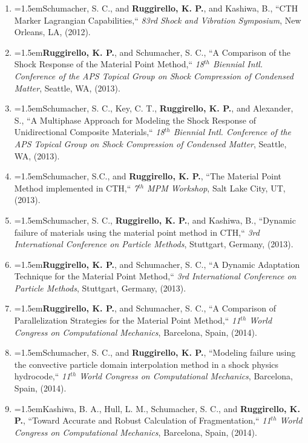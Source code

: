 \documentclass{scrartcl}
\newcommand{\NewCPap}[5]{\noindent\hangindent=1.5em\hangafter=0\footnotesize #1, ``#2,`` \textit{#3}, #4, (#5). %
\vspace{0.em} \normalsize} %
\begin{document}
\begin{cv}{}
\begin{mdframed}[
  linecolor=white,%
  leftmargin =-0cm,
  rightmargin =+0cm,
]
\begin{enumerate}
\item\NewCPap{Schumacher, S. C., and \textbf{Ruggirello, K. P.}, and Kashiwa, B.}{CTH Marker Lagrangian Capabilities}{83rd Shock and Vibration Symposium}{New Orleans, LA}{2012}

\item\NewCPap{\textbf{Ruggirello, K. P.}, and Schumacher, S. C.}{A Comparison of the Shock Response of the Material Point Method}{18$^{th}$ Biennial Intl. Conference of the APS Topical Group on Shock Compression of Condensed Matter}{Seattle, WA}{2013}

\item\NewCPap{Schumacher, S. C., Key, C. T., \textbf{Ruggirello, K. P.}, and Alexander, S.}{A Multiphase Approach for Modeling the Shock Response of Unidirectional Composite Materials}{18$^{th}$ Biennial Intl. Conference of the APS Topical Group on Shock Compression of Condensed Matter}{Seattle, WA}{2013}

\item\NewCPap{Schumacher, S.C., and \textbf{Ruggirello, K. P.}}{The Material Point Method implemented in CTH}{7$^{th}$ MPM Workshop}{Salt Lake City, UT}{2013}

\item\NewCPap{Schumacher, S. C., \textbf{Ruggirello, K. P.}, and Kashiwa, B.}{Dynamic failure of materials using the material point method in CTH}{3rd International Conference on Particle Methods}{Stuttgart, Germany}{2013}

\item\NewCPap{\textbf{Ruggirello, K. P.}, and Schumacher, S. C.}{A Dynamic Adaptation Technique for the Material Point Method}{3rd International Conference on Particle Methods}{Stuttgart, Germany}{2013}

\item\NewCPap{\textbf{Ruggirello, K. P.}, and Schumacher, S. C.}{A Comparison of Parallelization Strategies for the Material Point Method}{11$^{th}$ World Congress on Computational Mechanics}{Barcelona, Spain}{2014}

\item\NewCPap{Schumacher, S. C., and \textbf{Ruggirello, K. P.}}{Modeling failure using the convective particle domain interpolation method in a shock physics hydrocode}{11$^{th}$ World Congress on Computational Mechanics}{Barcelona, Spain}{2014}

\item\NewCPap{Kashiwa, B. A., Hull, L. M., Schumacher, S. C., and \textbf{Ruggirello, K. P.}}{Toward Accurate and Robust Calculation of Fragmentation}{11$^{th}$ World Congress on Computational Mechanics}{Barcelona, Spain}{2014}


\end{enumerate}
\end{mdframed}
\end{cv}
\end{document}
